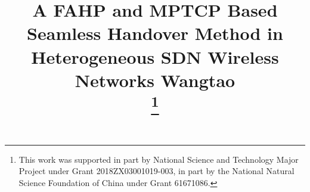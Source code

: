 \documentclass[conference]{IEEEtran}
\begin{document}
\title{A FAHP and MPTCP Based Seamless Handover Method in Heterogeneous SDN Wireless Networks Wangtao 
	 \\
\thanks{
	This work was supported in part by National Science and Technology Major Project under Grant 2018ZX03001019-003, in part by the National Natural Science Foundation of China under Grant 61671086.
}
}

\author{
}

\maketitle
\end{document}
